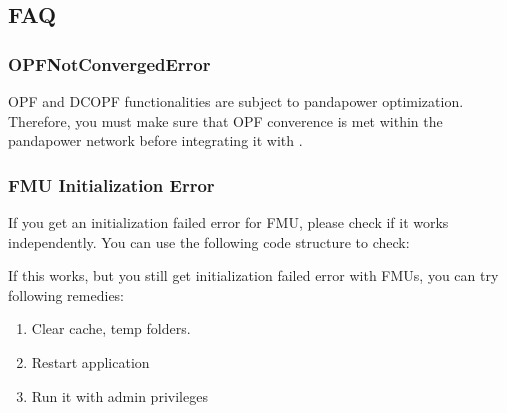 \documentclass[letterpaper,10pt,english]{sphinxmanual}
\begin{document}
\begin{sphinxVerbatim}[commandchars=\\\{\}]
  
\end{sphinxVerbatim}


\subsection{FAQ}
\label{\detokenize{faq:faq}}\label{\detokenize{faq::doc}}

\subsubsection{OPFNotConvergedError}
\label{\detokenize{faq:opfnotconvergederror}}
OPF and DCOPF functionalities are subject to pandapower optimization. Therefore, you must make sure that OPF converence is met within the pandapower network before integrating it with .


\subsubsection{FMU Initialization Error}
\label{\detokenize{faq:fmu-initialization-error}}
If you get an initialization failed error for FMU, please check if it works independently. You can use the following code structure to check:

\begin{sphinxVerbatim}[commandchars=\\\{\}]
   
  
\end{sphinxVerbatim}

If this works, but you still get initialization failed error with FMUs, you can try following remedies:
\begin{enumerate}
%
\item {} 
Clear cache, temp folders.

\item {} 
Restart application

\item {} 
Run it with admin privileges

\end{enumerate}
\end{document}
